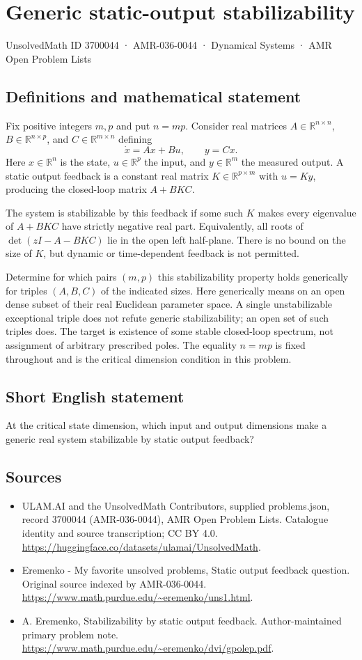 \documentclass[11pt,a4paper]{article}
\begin{document}
\section*{Generic static-output stabilizability}\label{3700044}
{\small UnsolvedMath ID 3700044 · AMR-036-0044 · Dynamical Systems · AMR Open Problem Lists}
\subsection{Definitions and mathematical statement}
Fix positive integers $m,p$ and put $n=mp$.
Consider real matrices
$A\in\mathbb R^{n\times n}$,
$B\in\mathbb R^{n\times p}$, and
$C\in\mathbb R^{m\times n}$ defining
\[
                  \dot x=Ax+Bu,\qquad y=Cx.
\]
Here $x\in\mathbb R^n$ is the state,
$u\in\mathbb R^p$ the input, and
$y\in\mathbb R^m$ the measured output.
A static output feedback is a constant real
matrix $K\in\mathbb R^{p\times m}$ with
$u=Ky$, producing the closed-loop matrix
$A+BKC$.

The system is stabilizable by this feedback if
some such $K$ makes every eigenvalue of
$A+BKC$ have strictly negative real part.
Equivalently, all roots of
$\det(zI-A-BKC)$ lie in the open left
half-plane. There is no bound on the size
of $K$, but dynamic or time-dependent feedback
is not permitted.

Determine for which pairs $(m,p)$ this
stabilizability property holds generically for
triples $(A,B,C)$ of the indicated sizes.
Here generically means on an open dense
subset of their real Euclidean parameter
space. A single unstabilizable exceptional
triple does not refute generic stabilizability;
an open set of such triples does.
The target is existence of some stable
closed-loop spectrum, not assignment of
arbitrary prescribed poles. The equality
$n=mp$ is fixed throughout and is the
critical dimension condition in this problem.
\subsection{Short English statement}
At the critical state dimension, which input and output dimensions make a generic real system stabilizable by static output feedback?
\subsection{Sources}
\begin{itemize}
\item[S1] ULAM.AI and the UnsolvedMath Contributors, supplied problems.json, record 3700044 (AMR-036-0044), AMR Open Problem Lists. Catalogue identity and source transcription; CC BY 4.0.
\url{https://huggingface.co/datasets/ulamai/UnsolvedMath}.
\item[S2] Eremenko - My favorite unsolved problems, Static output feedback question. Original source indexed by AMR-036-0044.
\url{https://www.math.purdue.edu/~eremenko/uns1.html}.
\item[S3] A. Eremenko, Stabilizability by static output feedback. Author-maintained primary problem note.
\url{https://www.math.purdue.edu/~eremenko/dvi/gpolep.pdf}.
\end{itemize}
\end{document}
